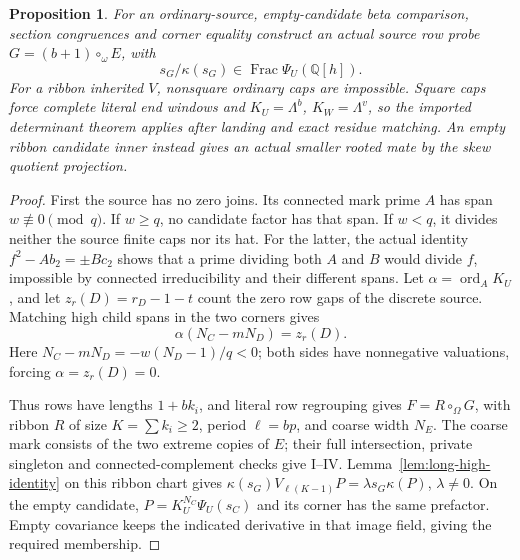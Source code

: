\documentclass[11pt,a4paper]{amsart}
\numberwithin{equation}{section}
\theoremstyle{plain}
\newtheorem{proposition}[theorem]{Proposition}
\theoremstyle{definition}
\begin{document}
\begin{proposition}\label{prop:empty-parent-entry}
For an ordinary-source, empty-candidate beta comparison, section congruences and corner equality construct an actual source row probe \(G=(b+1)\circ_\omega E\), with
\[
 s_G/\kappa(s_G)\in\operatorname{Frac}\Psi_U(\mathbb Q[h]).
\]
For a ribbon inherited \(V\), nonsquare ordinary caps are impossible.  Square caps force complete literal end windows and \(K_U=\Lambda^b\), \(K_W=\Lambda^v\), so the imported determinant theorem applies after landing and exact residue matching.  An empty ribbon candidate inner instead gives an actual smaller rooted mate by the skew quotient projection.
\end{proposition}
\begin{proof}
First the source has no zero joins.  Its connected mark prime \(A\) has span \(w\not\equiv0\pmod q\).  If \(w\ge q\), no candidate factor has that span.  If \(w<q\), it divides neither the source finite caps nor its hat.  For the latter, the actual identity \(f^2-Ab_2=\pm Bc_2\) shows that a prime dividing both \(A\) and \(B\) would divide \(f\), impossible by connected irreducibility and their different spans.  Let \(\alpha=\operatorname{ord}_A K_U\), and let \(z_r(D)=r_D-1-t\) count the zero row gaps of the discrete source.  Matching high child spans in the two corners gives
\[
 \alpha(N_C-mN_D)=z_r(D).
\]
Here \(N_C-mN_D=-w(N_D-1)/q<0\); both sides have nonnegative valuations, forcing \(\alpha=z_r(D)=0\).

Thus rows have lengths \(1+bk_i\), and literal row regrouping gives \(F=R\circ_\Omega G\), with ribbon \(R\) of size \(K=\sum k_i\ge2\), period \(\ell=bp\), and coarse width \(N_E\).  The coarse mark consists of the two extreme copies of \(E\); their full intersection, private singleton and connected-complement checks give I--IV.  Lemma~\ref{lem:long-high-identity} on this ribbon chart gives
\(\kappa(s_G)V_{\ell(K-1)}P=\lambda s_G\kappa(P)\), \(\lambda\ne0\).
On the empty candidate, \(P=K_U^{N_C}\Psi_U(s_C)\) and its corner has the same prefactor.  Empty covariance keeps the indicated derivative in that image field, giving the required membership.


\end{proof}
\end{document}
